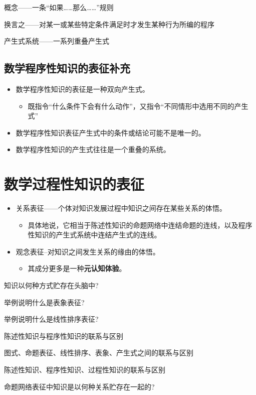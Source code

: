 概念——一条“如果……那么……”规则

换言之——对某一或某些特定条件满足时才发生某种行为所编的程序

产生式系统——一系列重叠产生式

\subsection{数学程序性知识的表征补充}

\begin{itemize}
    \item 数学程序性知识的表征是一种双向产生式。
    \begin{itemize}
        \item 既指令“什么条件下会有什么动作”，又指令“不同情形中选用不同的产生式”
    \end{itemize}
    \item 数学程序性知识表征产生式中的条件或结论可能不是唯一的。
    \item 数学程序性知识的产生式往往是一个重叠的系统。
\end{itemize}


\section{数学过程性知识的表征}

\begin{itemize}
    \item 关系表征——个体对知识发展过程中知识之间存在某些关系的体悟。
    \begin{itemize}
        \item 具体地说，它相当于陈述性知识的命题网络中连结命题的连线，以及程序性知识的产生式系统中连结产生式的连线。
    \end{itemize}
    \item 观念表征--对知识之间发生关系的缘由的体悟。
    \begin{itemize}
        \item 其成分更多是一种\textbf{元认知体验}。
    \end{itemize}
\end{itemize}




\begin{problemset}[习题]
  \item 知识以何种方式贮存在头脑中?
  \item 举例说明什么是表象表征?
  \item 举例说明什么是线性排序表征?
  \item 陈述性知识与程序性知识的联系与区别
  \item 图式、命题表征、线性排序、表象、产生式之间的联系与区别
  \item 陈述性知识、程序性知识、过程性知识的联系与区别
  \item 命题网络表征中知识是以何种关系贮存在一起的?
\end{problemset}
